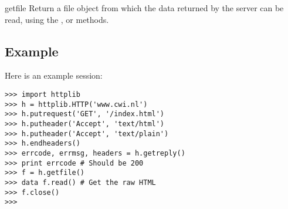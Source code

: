 \begin{funcdesc}{getfile}{}
Return a file object from which the data returned by the server can be
read, using the ,  or 
methods.
\end{funcdesc}

\subsection{Example}

Here is an example session:

\begin{verbatim}
>>> import httplib
>>> h = httplib.HTTP('www.cwi.nl')
>>> h.putrequest('GET', '/index.html')
>>> h.putheader('Accept', 'text/html')
>>> h.putheader('Accept', 'text/plain')
>>> h.endheaders()
>>> errcode, errmsg, headers = h.getreply()
>>> print errcode # Should be 200
>>> f = h.getfile()
>>> data f.read() # Get the raw HTML
>>> f.close()
>>> 
\end{verbatim}
